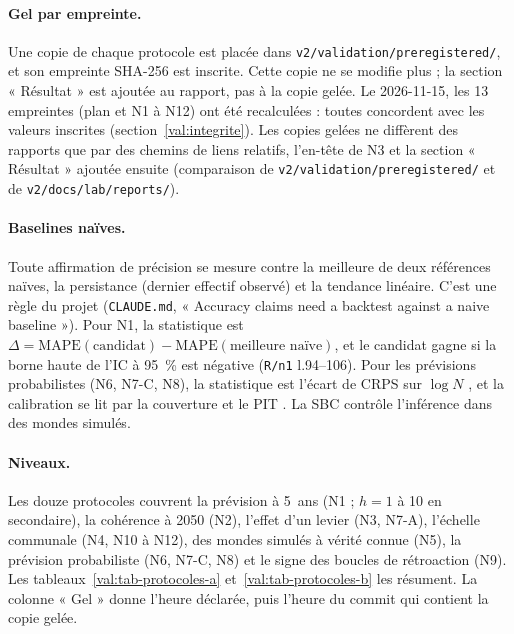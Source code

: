 \paragraph{Gel par empreinte.} Une copie de chaque protocole est placée dans
\texttt{v2/\allowbreak validation/\allowbreak preregistered/}, et son empreinte SHA-256 est inscrite. Cette copie ne se
modifie plus ; la section « Résultat » est ajoutée au rapport, pas à la copie gelée. Le
2026-11-15, les \num{13}\mesure{} empreintes (plan et N1 à N12) ont été recalculées : toutes
concordent avec les valeurs inscrites (section~\ref{val:integrite}). Les copies gelées ne
diffèrent des rapports que par des chemins de liens relatifs, l'en-tête de N3 et la section
« Résultat » ajoutée ensuite (comparaison de \texttt{v2/\allowbreak validation/\allowbreak preregistered/} et de \texttt{v2/\allowbreak docs/\allowbreak lab/\allowbreak reports/}).

\paragraph{Baselines naïves.} Toute affirmation de précision se mesure contre la meilleure de deux
références naïves, la persistance (dernier effectif observé) et la tendance linéaire. C'est une
règle du projet (\texttt{CLAUDE.md}, « Accuracy claims need a backtest against a naive
baseline »). Pour N1, la statistique est
$\Delta = \mathrm{MAPE}(\text{candidat}) - \mathrm{MAPE}(\text{meilleure naïve})$, et le
candidat gagne si la borne haute de l'IC à 95~\% est négative (\texttt{R/n1} l.94--106). Pour les
prévisions probabilistes (N6, N7-C, N8), la statistique est l'écart de CRPS sur $\log N$
\citep{gneiting2007jasa}, et la calibration se lit par la couverture et le PIT
\citep{gneiting2007jrssb}. La SBC \citep{talts2018sbc} contrôle l'inférence dans des mondes
simulés.

\paragraph{Niveaux.} Les douze protocoles couvrent la prévision à 5\suppose{}~ans (N1 ; $h = 1$ à 10 en secondaire),
la cohérence à 2050 (N2), l'effet d'un levier (N3, N7-A), l'échelle communale (N4, N10 à N12),
des mondes simulés à vérité connue (N5), la prévision probabiliste (N6, N7-C, N8) et le signe des
boucles de rétroaction (N9). Les tableaux~\ref{val:tab-protocoles-a} et~\ref{val:tab-protocoles-b}
les résument. La colonne « Gel » donne l'heure déclarée, puis l'heure du commit qui contient la
copie gelée.

